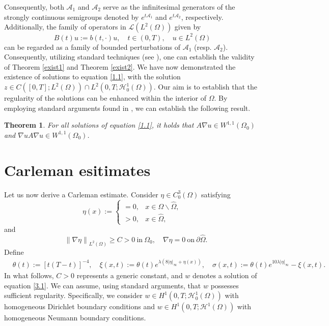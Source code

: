 \documentclass[9pt,reqno]{amsart}
\newtheorem{theorem}{Theorem}
\theoremstyle{plain}
\numberwithin{equation}{section}
\numberwithin{theorem}{section}
\def\Om{\Omega}
\def\Om{\Omega}
\begin{document}
	
	Consequently, both $\mathcal{A}_1$ and $\mathcal{A}_2$ serve as the infinitesimal generators of the strongly continuous semigroups denoted by $e^{t\mathcal{A}_1}$ and $e^{t\mathcal{A}_2}$, respectively. Additionally, the family of operators in $\mathcal{L}(L^2(\Om))$ given by
	$$
	B(t)u := b(t,\cdot)u, \quad t\in (0,T), \quad u\in L^2(\Om)
	$$
	can be regarded as a family of bounded perturbations of $\mathcal{A}_1$ (resp. $\mathcal{A}_2$). Consequently, utilizing standard techniques (see \cite{bensoussan2007representation,cazenave1998introduction,showalter1995hilbert}), one can establish the validity of Theorem \ref{exist1} and Theorem \ref{exist2}.
	We have now demonstrated the existence of solutions to equation \eqref{1.1}, with the solution $z \in C([0,T];L^{2}(\Omega))\cap L^{2}(0,T;\mathcal{H}_0^{1}(\Omega))$. Our aim is to establish that the regularity of the solutions can be enhanced within the interior of $\Omega$. By employing standard arguments found in \cite{EVANS}, we can establish the following result.
	\begin{theorem}\label{Regularity}
		For all solutions of equation \eqref{1.1}, it holds that $A\nabla u \in W^{1,1}(\Om_0)$ and $\nabla u A\nabla u \in W^{1,1}(\Om_0)$.
	\end{theorem}
	
	\section{Carleman esitimates}
	Let us now derive a Carleman estimate. Consider $\eta \in C_0^3(\Omega)$ satisfying
	\begin{equation*}
		\eta(x) :=
		\begin{cases}
			=0, & x \in \Omega\backslash\hat{\Om},\\
			>0, & x \in \hat{\Om},
		\end{cases}
	\end{equation*}
	and
	\begin{equation*}
		\quad \left\| \nabla \eta \right\|_{L^2(\Om)} \ge C >0 \ \mbox{in} \ \Om_0, \quad  \nabla \eta=0 \ \mbox{on} \ \partial \hat{\Om}.
	\end{equation*}
	Define
	\begin{equation*}
		\begin{split}
			& \theta(t):=[t(T-t)]^{-4}, \quad \xi(x, t):=\theta(t) e^{ \lambda(8|\eta|_\infty+\eta (x))}, \quad \sigma(x, t):=\theta(t) e^{10 \lambda|\eta|_\infty}-\xi(x, t).
		\end{split}
	\end{equation*}
	In what follows, $C>0$ represents a generic constant, and $w$ denotes a solution of equation \eqref{3.1}. We can assume, using standard arguments, that $w$ possesses sufficient regularity. Specifically, we consider $w \in H^1(0,T; \mathcal{H}_0^1(\Omega))$ with homogeneous Dirichlet boundary conditions and $w \in H^1(0,T; \mathcal{H}^1(\Omega))$ with homogeneous Neumann boundary conditions.
	
\end{document}
